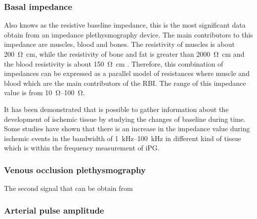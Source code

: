 \subsubsection{Basal impedance}
Also knows as the resistive baseline impedance, this is the most significant data obtain from an impedance plethysmography device. The main contributors to this impedance are muscles, blood and bones. The resistivity of muscles is about \SI{200}{\ohm\cm}, while the resistivity of bone and fat is greater than \SI{2000}{\ohm\cm} and the blood resistivity is about \SI{150}{\ohm\cm} \cite{gabriel1996dielectric}. Therefore, this combination of impedances can be expressed as a parallel model of resistances where muscle and blood which are the main contributors of the RBI. The range of this impedance value is from \SIrange{10}{100}{\ohm}. 


It has been demonstrated that is possible to gather information about the development of ischemic tissue by studying the changes of baseline during time. Some studies have shown that there is an increase in the impedance value during ischemic events in the bandwidth of \SIrange{1}{100}{\kilo\hertz} in different kind of tissue \cite{songer2001tissue,casas1999vivo,kun1994tissue,ristic1997muscle} which is within the frequency measurement of iPG. 

\subsubsection{Venous occlusion plethysmography}
The second signal that can be obtain from

\subsubsection{Arterial pulse amplitude}

